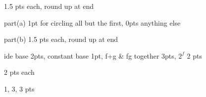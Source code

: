 \documentclass[quiz]{mcs}
\begin{document}
\final


\examspace %
\begin{staffnotes}
1.5 pts each, round up at end
\end{staffnotes}

\examspace  %
\begin{staffnotes}
part(a) 1pt for circling all but the first, 0pts anything else

part(b) 1.5 pts each, round up at end
\end{staffnotes}

\iffalse
\examspace %
NO \pinput[points = 10, title =
  \textbf{partial order short answer}]{FP_partial_order_short_answer}

\examspace  %
\pinput[points = 6, title =
NO \textbf{FP_large_numbers_quantifiers}]{FP_large_numbers_quantifiers}

\examspace from S11
\pinput[points = 6, title =
MAYBE  \textbf{binary relations on 01}]{FP_binary_relations_on_01}

\examspace
\pinput[points=6, title =
NO  \textbf{4 and 7 cent stamps by induction}]{FP_4_and_7_cent_stamps_by_induction}
\fi

\examspace
\begin{staffnotes}
ide base 2pts, constant base 1pt, f+g \& fg  together 3pts, $2^f$ 2 pts
\end{staffnotes}

\examspace %
\begin{staffnotes}
2 pts each
\end{staffnotes}

\examspace
\begin{staffnotes}
1, 3, 3 pts
\end{staffnotes}
\end{document}
